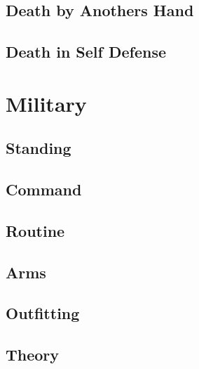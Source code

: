 \subsection{Death by Anothers Hand}
\subsection{Death in Self Defense}

\section{Military}
\subsection{Standing}
\subsection{Command}
\subsection{Routine}
\subsection{Arms}
\subsection{Outfitting}
\subsection{Theory}

